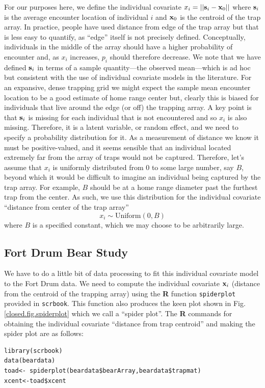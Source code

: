 For our purposes here, we define the individual covariate $x_{i} = ||{\bf s}_{i} - {\bf
  x}_{0}||$ where ${\bf s}_{i}$ is the average encounter location of
individual $i$ and ${\bf x}_{0}$ is the centroid of the trap array.
In practice, people have
used distance from edge of the trap array but that is less easy to
quantify, as ``edge'' itself is not precisely defined.
Conceptually, individuals in the middle of the array should have a
higher probability of encounter and, as $x_{i}$ increases, $p_{i}$
should therefore decrease. We note that we have defined ${\bf s}_{i}$
in terms of a sample quantity---the observed mean---which is ad hoc
but consistent with the use of individual covariate models
 in the literature.  For an
expansive, dense trapping grid we might expect the sample mean
encounter location to be a good estimate of home range center but,
clearly this is biased for individuals that live around the edge (or
off) the trapping array. 
 A key point is that
${\bf s}_{i}$ is missing for each individual that is not encountered
and so  $x_{i}$ is also missing. Therefore, it is a latent variable, or random
effect, and we need  to specify a probability distribution
for it.  As a measurement of distance we know it must be
positive-valued, and it seems sensible that an individual located
extremely far from the array of traps would not be captured.
Therefore, let's assume that $x_{i}$ is uniformly distributed from $0$ to some large number,
say $B$, beyond which it would be difficult to imagine an
individual being captured by the trap array. For example, $B$ should be at a home
range diameter past the furthest trap from the center.  As such, we
use this distribution for the individual covariate ``distance from
center of the trap array''
\[
 x_{i} \sim \mbox{Uniform}(0,B)
\]
where $B$ is a specified constant, which we may choose to be
arbitrarily large.  


\subsection{Fort Drum Bear Study}


We have to do a little bit of data processing to fit this individual
covariate model to the Fort Drum data.  We need to compute the
individual covariate ${\bf x}_{i}$ (distance from the centroid of the
trapping array) using the {\bf R} function \mbox{\tt spiderplot}
provided in \mbox{\tt scrbook}. This function also produces the keen
plot shown in Fig. \ref{closed.fig.spiderplot} which we call a
``spider plot''.  The {\bf R} commands for obtaining the individual
covariate ``distance from trap centroid'' and making the spider plot
are as follows: 
\begin{verbatim}
library(scrbook)
data(beardata)
toad<- spiderplot(beardata$bearArray,beardata$trapmat)
xcent<-toad$xcent
\end{verbatim}


